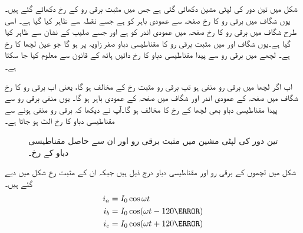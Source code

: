 شکل   میں تین دور کی لپٹی مشین دکھائی گئی ہے جس میں مثبت برقی رو کے رخ  دکھائے گئے ہیں۔یوں   شگاف میں برقی رو کا رخ صفحہ سے عمودی  باہر کو  ہے  جسے نقطہ سے ظاہر کیا گیا ہے۔ اسی طرح  شگاف میں برقی رو کا رخ صفحہ میں عمودی  اندر  کو ہے اور  جسے صلیب کے نشان سے ظاہر کیا گیا ہے۔یوں شگاف  اور  میں مثبت برقی رو کا مقناطیسی دباو  صفر زاویہ پر ہو گا جو عین لچھا  کا رخ  ہے۔ لچھے میں برقی رو سے پیدا مقناطیسی دباو  کا رخ دائیں ہاتھ کے قانون سے معلوم کیا جا سکتا ہے۔

 اب اگر لچھا  میں برقی رو منفی ہو تب برقی رو مثبت رخ کے مخالف ہو گا، یعنی اب برقی رو کا رخ  شگاف   میں صفحہ کے عمودی  اندر  اور شگاف   میں  صفحہ کے عمودی  باہر ہو گا۔ یوں منفی برقی رو سے پیدا مقناطیسی دباو بھی لچھا  کے رخ کا  مخالف ہو گا۔آپ نے دیکھا کہ برقی رو منفی ہونے سے مقناطیسی دباو کا رخ الٹ ہو جاتا ہے۔
\begin{figure}
\centering
\caption{تین دور کی لپٹی مشین میں مثبت برقی رو اور ان سے حاصل مقناطیسی دباو کے رخ۔}
\label{شکل_گھومتے_مشین_تین_دوری}
\end{figure}
شکل  میں لچھوں کے برقی رو اور مقناطیسی دباو درج ذیل ہیں جبکہ ان کے مثبت رخ شکل میں دیے گئے ہیں۔
\begin{gather}
\begin{aligned}\label{مساوات_گھومتے_مشین_تین_دور_برقی_رو}
i_a&=I_0 \cos \omega t\\
i_b&=I_0 \cos (\omega t-120\degree)\\
i_c&=I_0 \cos (\omega t+120\degree)
\end{aligned}
\end{gather}
